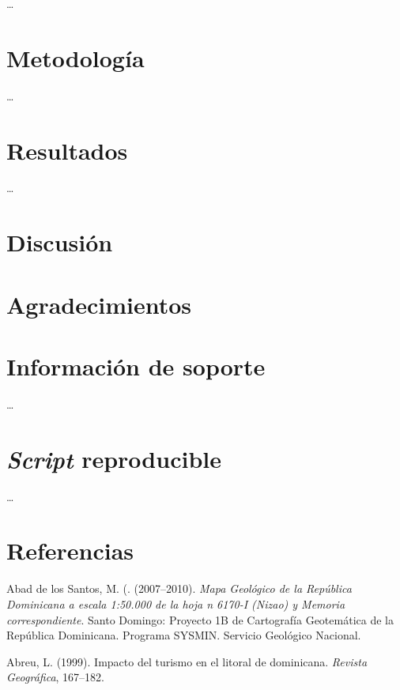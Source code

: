 \documentclass[11pt,]{article}
\begin{document}
\ldots

\section{Metodología}\label{metodologuxeda}

\ldots

\section{Resultados}\label{resultados}

\ldots

\section{Discusión}\label{discusiuxf3n}

\section{Agradecimientos}\label{agradecimientos}

\section{Información de soporte}\label{informaciuxf3n-de-soporte}

\ldots

\section{\texorpdfstring{\emph{Script}
reproducible}{Script reproducible}}\label{script-reproducible}

\ldots

\section*{Referencias}\label{referencias}

\hypertarget{refs}{}
\hypertarget{ref-abad2007mapageonizao}{}
Abad de los Santos, M. (. (2007--2010). \emph{Mapa Geológico de la
República Dominicana a escala 1:50.000 de la hoja n 6170-I (Nizao) y
Memoria correspondiente}. Santo Domingo: Proyecto 1B de Cartografía
Geotemática de la República Dominicana. Programa SYSMIN. Servicio
Geológico Nacional.

\hypertarget{ref-abreu1999impacto}{}
Abreu, L. (1999). Impacto del turismo en el litoral de dominicana.
\emph{Revista Geográfica}, 167--182.
\end{document}
